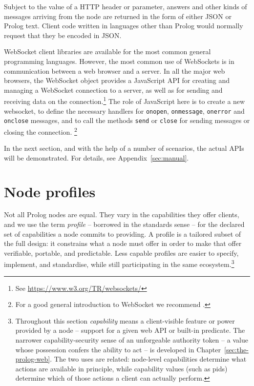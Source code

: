 Subject to the value of a HTTP header or parameter, answers and other kinds of messages arriving from the node are returned in the form of either JSON or Prolog text. Client code written in languages other than Prolog would normally request that they be encoded in JSON. 

WebSocket client libraries are available for the most common general programming languages. However, the most common use of WebSockets is in communication between a web browser and a server. In all the major web browsers, the WebSocket object provides a JavaScript API for creating and managing a WebSocket connection to a server, as well as for sending and receiving data on the connection.\footnote{See \url{https://www.w3.org/TR/websockets/}} The role of JavaScript here is to create a new websocket, to define the necessary handlers for \texttt{onopen}, \texttt{onmessage}, \texttt{onerror} and \texttt{onclose} messages, and to call the methods \texttt{send} or \texttt{close} for sending messages or closing the connection.%
\footnote{For a good general introduction to WebSocket we recommend \cite{lombardi2015websocket}.}

\medskip
\noindent In the next section, and with the help of a number of scenarios, the actual APIs will be demonstrated. For details, see Appendix~\ref{sec:manual}.

\section{Node profiles}\label{sec:node-profiles}

Not all Prolog nodes are equal. They vary in the capabilities they offer
clients, and we use the term \emph{profile} -- borrowed in the standards
sense -- for the declared set of capabilities a node commits to providing.
A profile is a tailored subset of the full design: it constrains what a node
must offer in order to make that offer verifiable, portable, and predictable.
Less capable profiles are easier to specify, implement, and standardise,
while still participating in the same ecosystem.\footnote{Throughout this
section \emph{capability} means a client-visible feature or power provided
by a node -- support for a given web API or built-in predicate. The narrower capability-security sense of an unforgeable authority token
-- a value whose possession confers the ability to act -- is developed in
Chapter~\ref{sec:the-prolog-web}. The two uses are related: node-level
capabilities determine what actions are available in principle, while
capability values (such as pids) determine which of those actions a client
can actually perform.}

